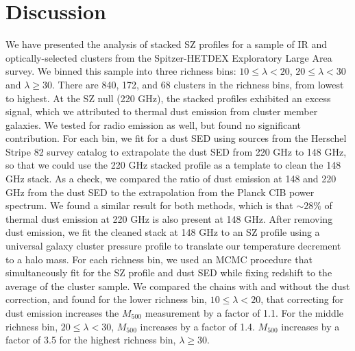 \documentclass[a4paper,fleqn,usenatbib]{mnras}
\begin{document}
\section{Discussion} \label{sec:conclusions}
We have presented the analysis of stacked SZ profiles for a sample of IR and optically-selected clusters from the Spitzer-HETDEX Exploratory Large Area survey. We binned this sample into three richness bins: $10 \leq \lambda < 20$, $20 \leq \lambda < 30$ and $\lambda \geq 30$. There are 840, 172, and 68 clusters in the richness bins, from lowest to highest. 
At the SZ null (220 GHz), the stacked profiles exhibited an excess signal, which we attributed to thermal dust emission from cluster member galaxies. We tested for radio emission as well, but found no significant contribution.  For each bin, we fit for a dust SED using sources from the Herschel Stripe 82 survey catalog to extrapolate the dust SED from 220 GHz to 148 GHz, so that we could use the 220 GHz stacked profile as a template to clean the 148 GHz stack. As a check, we compared the ratio of dust emission at 148 and 220 GHz from the dust SED to the extrapolation from the Planck CIB power spectrum. We found a similar result for both methods, which is that $\sim28\%$ of thermal dust emission at 220 GHz is also present at 148 GHz. 
After removing dust emission, we fit the cleaned stack at 148 GHz to an SZ profile using a universal galaxy cluster pressure profile to translate our temperature decrement to a halo mass. For each richness bin, we used an MCMC procedure that simultaneously fit for the SZ profile and dust SED while fixing redshift to the average of the cluster sample.  We compared the chains with and without the dust correction, and found for the lower richness bin, $10 \leq \lambda < 20$, that correcting for dust emission increases the $M_{500}$ measurement by a factor of 1.1. For the middle richness bin, $20 \leq \lambda < 30$, $M_{500}$ increases by a factor of 1.4. $M_{500}$ increases by a factor of 3.5 for the highest richness bin, $\lambda \geq 30$.
\end{document}
